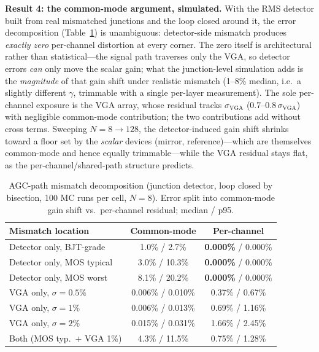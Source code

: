 \documentclass[11pt]{article}
\begin{document}
\textbf{Result 4: the common-mode argument, simulated.} With the RMS detector built from real mismatched junctions and the loop closed around it, the error decomposition (Table~\ref{tab:agcsweep}) is unambiguous: detector-side mismatch produces \textit{exactly zero} per-channel distortion at every corner. The zero itself is architectural rather than statistical---the signal path traverses only the VGA, so detector errors \textit{can} only move the scalar gain; what the junction-level simulation adds is the \textit{magnitude} of that gain shift under realistic mismatch (1--8\% median, i.e.\ a slightly different $\gamma$, trimmable with a single per-layer measurement). The sole per-channel exposure is the VGA array, whose residual tracks $\sigma_{\text{VGA}}$ ($0.7$--$0.8\,\sigma_{\text{VGA}}$) with negligible common-mode contribution; the two contributions add without cross terms. Sweeping $N=8\to128$, the detector-induced gain shift shrinks toward a floor set by the \textit{scalar} devices (mirror, reference)---which are themselves common-mode and hence equally trimmable---while the VGA residual stays flat, as the per-channel/shared-path structure predicts.

\begin{table}[h]
\centering
\caption{AGC-path mismatch decomposition (junction detector, loop closed by bisection, 100 MC runs per cell, $N=8$). Error split into common-mode gain shift vs.\ per-channel residual; median / p95.}
\label{tab:agcsweep}
\small
\begin{tabular}{lcc}
\toprule
Mismatch location & Common-mode & Per-channel \\
\midrule
Detector only, BJT-grade & 1.0\% / 2.7\% & \textbf{0.000\%} / 0.000\% \\
Detector only, MOS typical & 3.0\% / 10.3\% & \textbf{0.000\%} / 0.000\% \\
Detector only, MOS worst & 8.1\% / 20.2\% & \textbf{0.000\%} / 0.000\% \\
VGA only, $\sigma=0.5\%$ & 0.006\% / 0.010\% & 0.37\% / 0.67\% \\
VGA only, $\sigma=1\%$ & 0.006\% / 0.013\% & 0.69\% / 1.16\% \\
VGA only, $\sigma=2\%$ & 0.015\% / 0.031\% & 1.66\% / 2.45\% \\
Both (MOS typ.\ + VGA 1\%) & 4.3\% / 11.5\% & 0.75\% / 1.28\% \\
\bottomrule
\end{tabular}
\end{table}
\end{document}
